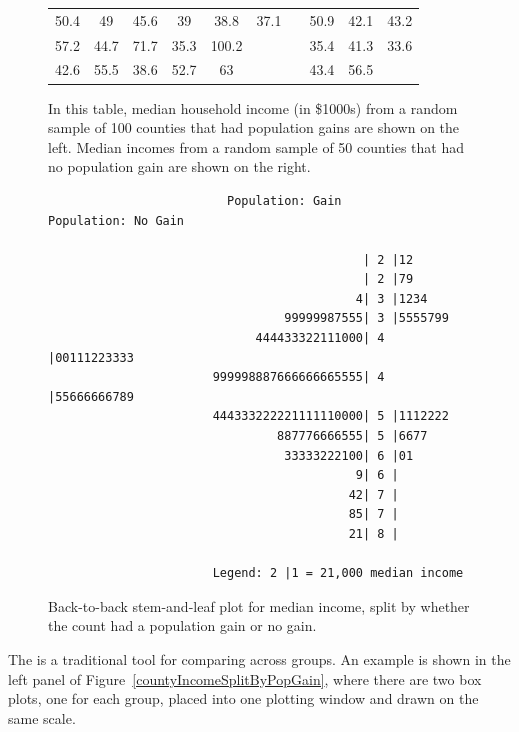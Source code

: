 \begin{figure}
\begin{center}
\begin{tabular}{ ccc ccc c ccc }
50.4 & 49 & 45.6 & 39 & 38.8 & 37.1 && 50.9 & 42.1 & 43.2 \\
57.2 & 44.7 & 71.7 & 35.3 & 100.2 &  && 35.4 & 41.3 & 33.6 \\
42.6 & 55.5 & 38.6 & 52.7 & 63 &  && 43.4 & 56.5 &  \\
\cline{1-6} \cline{8-10}
\end{tabular}
\caption{In this table, median household income (in \$1000s)
    from a random sample of 100 counties that had population
    gains are shown on the left.
    Median incomes from a random sample of 50 counties that
    had no population gain are shown on the right.}
\label{countyIncomeSplitByPopGainTable}
\end{center}
\end{figure}

\begin{figure}
\begin{verbatim}
                         Population: Gain           Population: No Gain

                                            | 2 |12                          
                                            | 2 |79                          
                                           4| 3 |1234                    
                                 99999987555| 3 |5555799                 
                             444433322111000| 4 |00111223333              
                       999998887666666665555| 4 |55666666789                
                       444333222221111110000| 5 |1112222                    
                                887776666555| 5 |6677                       
                                 33333222100| 6 |01                          
                                           9| 6 |                             
                                          42| 7 |                             
                                          85| 7 |                             
                                          21| 8 |    
               
                       Legend: 2 |1 = 21,000 median income
\end{verbatim}
\caption{Back-to-back stem-and-leaf plot for median income, split by whether the count had a population gain or no gain.}
\label{stemandleafincomepopgainloss}
\end{figure}

The 
is a traditional tool for comparing across groups.
An example is shown in the left panel of
Figure~\ref{countyIncomeSplitByPopGain},
where there are two box plots, one for each group,
placed into one plotting window and drawn on the same scale.

